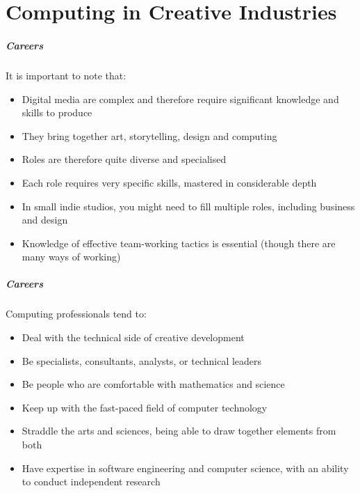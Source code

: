 
\part{Computing in Creative Industries}
\frame{\partpage}

\begin{frame}
	\frametitle{Careers}
	
	It is important to note that:\pause
	
	\begin{itemize}
		\item Digital media are complex and therefore require significant knowledge and skills to produce \pause
		\item They bring together art, storytelling, design and computing \pause
		\item Roles are therefore quite diverse and specialised \pause
		\item Each role requires very specific skills, mastered in considerable depth \pause
		\item In small indie studios, you might need to fill multiple roles, including business and design \pause
		\item Knowledge of effective team-working tactics is essential (though there are many ways of working)
	\end{itemize}
\end{frame}

\begin{frame}
	\frametitle{Careers}
	
	Computing professionals tend to:
	
	\begin{itemize}
		\item Deal with the technical side of creative development \pause
		\item Be specialists, consultants, analysts, or technical leaders \pause
		\item Be people who are comfortable with mathematics and science \pause
		\item Keep up with the fast-paced field of computer technology \pause
		\item Straddle the arts and sciences, being able to draw together elements from both \pause
		\item Have expertise in software engineering and computer science, with an ability to conduct independent research
	\end{itemize}
\end{frame}

